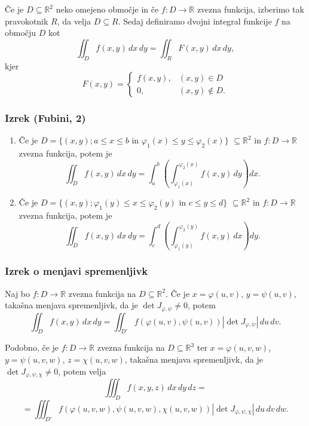 \documentclass{article}
\begin{document}
\begin{multicols}{2}
Če je \( D \subseteq \mathbb{R}^2 \) neko omejeno območje in če \( f: D \rightarrow \mathbb{R} \) zvezna funkcija, izberimo tak pravokotnik \( R \), da velja \( D \subseteq R \). Sedaj definiramo dvojni integral funkcije \( f \) na območju \( D \) kot
\[
\iint_D f(x,y) \,dx\,dy = \iint_R F(x,y) \,dx\,dy,
\]
kjer
\[
F(x,y) = \begin{cases} 
f(x,y), & (x,y) \in D \\
0, & (x,y) \not\in D.
\end{cases}
\]

\subsubsection{Izrek (Fubini, 2)} 
\begin{enumerate}
\item Če je \( D = \{(x,y); a \leq x \leq b \text{ in } \varphi_1(x) \leq y \leq \varphi_2(x)\} \) \( \subseteq \mathbb{R}^2 \) in \( f: D \rightarrow \mathbb{R} \) zvezna funkcija, potem je
\[
\iint_D f(x,y) \,dx\,dy = \int_a^b \left( \int_{\varphi_1(x)}^{\varphi_2(x)} f(x,y) \,dy \right) dx.
\]

\item Če je \( D = \{(x,y); \varphi_1(y) \leq x \leq \varphi_2(y) \text{ in } c \leq y \leq d\} \) \( \subseteq \mathbb{R}^2 \) in \( f: D \rightarrow \mathbb{R} \) zvezna funkcija, potem je
\[
\iint_D f(x,y) \,dx\,dy = \int_c^d \left( \int_{\varphi_1(y)}^{\varphi_2(y)} f(x,y) \,dx \right) dy.
\]
\end{enumerate}

\subsubsection{Izrek o menjavi spremenljivk} 
Naj bo \( f: D \rightarrow \mathbb{R} \) zvezna funkcija na \( D \subseteq \mathbb{R}^2 \). Če je \( x = \varphi(u, v) \), \( y = \psi(u, v) \), takašna menjava spremenljivk, da je \( \det J_{\varphi,\psi} \neq 0 \), potem
\[
\iint_D f(x, y) \,dx\,dy = \iint_{D'} f(\varphi(u, v), \psi(u, v)) \left| \det J_{\varphi,\psi} \right| \,du\,dv.
\]

Podobno, če je \( f: D \rightarrow \mathbb{R} \) zvezna funkcija na \( D \subseteq \mathbb{R}^3 \) ter \( x = \varphi(u, v, w) \), \( y = \psi(u, v, w) \), \( z = \chi(u, v, w) \), takašna menjava spremenljivk, da je \( \det J_{\varphi,\psi,\chi} \neq 0 \), potem velja
\[
\iiint_D f(x, y, z) \,dx\,dy\,dz = 
\]
\[
 = \iiint_{D'} f(\varphi(u, v, w), \psi(u, v, w), \chi(u, v, w)) \left| \det J_{\varphi,\psi,\chi} \right| \,du\,dv\,dw.
\]


\end{multicols}
\end{document}
